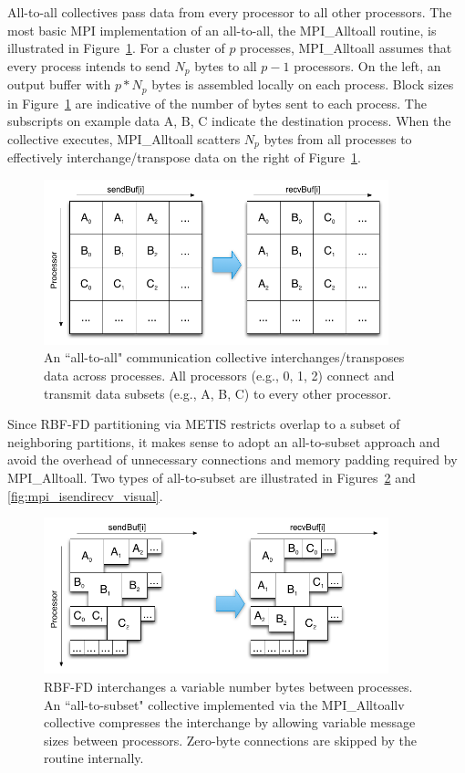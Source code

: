 \documentclass{report}
\begin{document}
All-to-all collectives pass data from every processor to all other processors. The most basic MPI implementation of an all-to-all, the MPI\_Alltoall routine, is illustrated in Figure~\ref{fig:mpi_alltoall_visual}. For a cluster of $p$ processes, MPI\_Alltoall assumes that every process intends to send $N_p$ bytes to all $p-1$ processors. On the left, an output buffer with $p*N_p$ bytes is assembled locally on each process. Block sizes in Figure~\ref{fig:mpi_alltoall_visual} are indicative of the number of bytes sent to each process. The subscripts on example data A, B, C indicate the destination process.  When the collective executes, MPI\_Alltoall scatters $N_p$ bytes from all processes to effectively interchange/transpose data on the right of Figure~\ref{fig:mpi_alltoall_visual}. 

\begin{figure}
\centering
\includegraphics[width=10cm]{../figures/omnigraffle/MPI_Alltoall_Visual.png}
\caption{An ``all-to-all" communication collective interchanges/transposes data across processes. All processors (e.g., 0, 1, 2) connect and transmit data subsets (e.g., A, B, C) to every other processor.}
\label{fig:mpi_alltoall_visual}
\end{figure}

Since RBF-FD partitioning via METIS restricts overlap to a subset of neighboring partitions, it makes sense to adopt an all-to-subset approach and avoid the overhead of unnecessary connections and memory padding required by MPI\_Alltoall. 
Two types of all-to-subset are illustrated in Figures~\ref{fig:mpi_alltoallv_visual} and \ref{fig:mpi_isendirecv_visual}. 


\begin{figure}
\centering
\includegraphics[width=10cm]{../figures/omnigraffle/MPI_Alltoallv_Visual.png}
\caption{RBF-FD interchanges a variable number bytes between processes. An ``all-to-subset" collective implemented via the MPI\_Alltoallv collective compresses the interchange by allowing variable message sizes between processors. Zero-byte connections are skipped by the routine internally.}
\label{fig:mpi_alltoallv_visual}
\end{figure}
\end{document}

